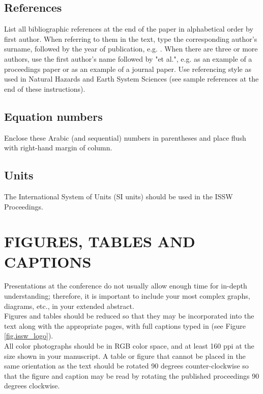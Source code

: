 \documentclass[3p,authoryear,times,twocolumn]{elsarticle_issw2018}
\begin{document}
\subsection{References}
List all bibliographic references at the end of the paper in alphabetical order by first author. When referring to them in the text, type the corresponding author's surname, followed by the year of publication, e.g. \cite{McClung2006}. When there are three or more authors, use the first author's name followed by "et al.", e.g. \cite{Greene2006} as an example of a proceedings paper or \cite{Fischer2022} as an example of a journal paper. Use referencing style as used in Natural Hazards and Earth System Sciences (see sample references at the end of these instructions).

%
\subsection{Equation numbers}
Enclose these Arabic (and sequential) numbers in parentheses and place flush with right-hand margin of column.
%
\subsection{Units}
The International System of Units (SI units) should be used in the ISSW Proceedings.
%
\section{FIGURES, TABLES AND CAPTIONS}
Presentations at the conference do not usually allow enough time for in-depth understanding; therefore, it is important to include your most complex graphs, diagrams, etc., in your extended abstract.\\
%

\noindent
Figures and tables should be reduced so that they may be incorporated into the text along with the appropriate pages, with full captions typed in (see Figure \ref{fig.issw_logo}).\\

\noindent
All color photographs should be in RGB color space, and at least 160 ppi at the size shown in your manuscript. A table or figure that cannot be placed in the same orientation as the text should be rotated 90 degrees counter-clockwise so that the figure and caption may be read by rotating the published proceedings 90 degrees clockwise. \\
\end{document}
